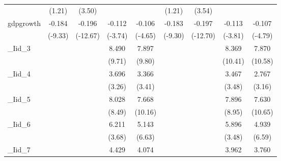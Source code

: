 {\begin{tabular}{l*{8}{c}}
            &      (1.21)         &      (3.50)         &                     &                     &      (1.21)         &      (3.54)         &                     &                     \\
[1em]
gdpgrowth   &      -0.184\sym{***}&      -0.196\sym{***}&      -0.112\sym{***}&      -0.106\sym{***}&      -0.183\sym{***}&      -0.197\sym{***}&      -0.113\sym{***}&      -0.107\sym{***}\\
            &     (-9.33)         &    (-12.67)         &     (-3.74)         &     (-4.65)         &     (-9.30)         &    (-12.70)         &     (-3.81)         &     (-4.79)         \\
[1em]
\_Iid\_3      &                     &                     &       8.490\sym{***}&       7.897\sym{***}&                     &                     &       8.369\sym{***}&       7.870\sym{***}\\
            &                     &                     &      (9.71)         &      (9.80)         &                     &                     &     (10.41)         &     (10.58)         \\
[1em]
\_Iid\_4      &                     &                     &       3.696\sym{**} &       3.366\sym{***}&                     &                     &       3.467\sym{***}&       2.767\sym{**} \\
            &                     &                     &      (3.26)         &      (3.41)         &                     &                     &      (3.48)         &      (3.16)         \\
[1em]
\_Iid\_5      &                     &                     &       8.028\sym{***}&       7.668\sym{***}&                     &                     &       7.896\sym{***}&       7.630\sym{***}\\
            &                     &                     &      (8.49)         &     (10.16)         &                     &                     &      (8.95)         &     (10.65)         \\
[1em]
\_Iid\_6      &                     &                     &       6.211\sym{***}&       5.143\sym{***}&                     &                     &       5.896\sym{***}&       4.939\sym{***}\\
            &                     &                     &      (3.68)         &      (6.63)         &                     &                     &      (3.48)         &      (6.59)         \\
[1em]
\_Iid\_7      &                     &                     &       4.429\sym{***}&       4.074\sym{***}&                     &                     &       3.962\sym{***}&       3.760\sym{***}\\

\end{tabular}}
